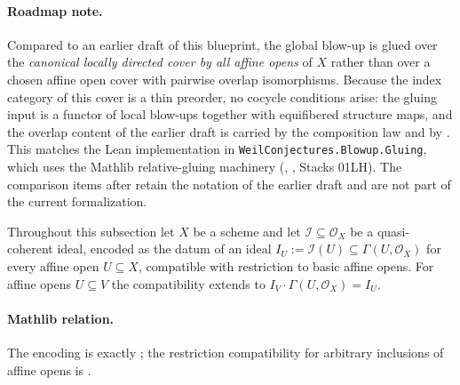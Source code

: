 \paragraph{Roadmap note.}  Compared to an earlier draft of this blueprint,
the global blow-up is glued over the \emph{canonical locally directed
cover by all affine opens} of $X$ rather than over a chosen affine open
cover with pairwise overlap isomorphisms.  Because the index category of
this cover is a thin preorder, no cocycle conditions arise: the gluing
input is a functor of local blow-ups together with equifibered structure
maps, and the overlap content of the earlier draft is carried by the
composition law  and by
.  This matches the Lean
implementation in \texttt{WeilConjectures.Blowup.Gluing}, which uses the
Mathlib relative-gluing machinery
(\texttt{},
\texttt{},
Stacks 01LH).  The comparison items after
 retain the notation of
the earlier draft and are not part of the current formalization.

Throughout this subsection let $X$ be a scheme and let
$\mathcal I\subseteq\mathcal O_X$ be a quasi-coherent ideal, encoded as
the datum of an ideal $I_U:=\mathcal I(U)\subseteq\Gamma(U,\mathcal O_X)$
for every affine open $U\subseteq X$, compatible with restriction to
basic affine opens.  For affine opens $U\subseteq V$ the compatibility
extends to $I_V\cdot\Gamma(U,\mathcal O_X)=I_U$.

\paragraph{Mathlib relation.}
The encoding is exactly
\texttt{}; the
restriction compatibility for arbitrary inclusions of affine opens is
\texttt{}.


